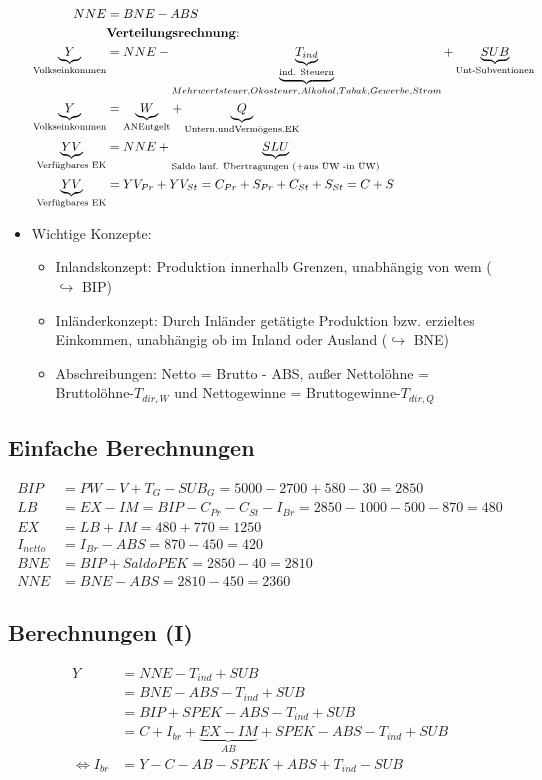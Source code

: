 \documentclass{scrartcl}
\begin{document}
\begin{itemize}
\begin{align*}
      NNE &= BNE - ABS\\
&\text{\textbf{Verteilungsrechnung}:}\\
      \underbrace{Y}_\text{Volkseinkommen} &= NNE - \underbrace{\underbrace{T_{ind}}_\text{ind. Steuern}}_{Mehrwertsteuer, Okosteuer, Alkohol, Tabak, Gewerbe, Strom} + \underbrace{SUB}_\text{Unt-Subventionen}\\
      \underbrace{Y}_\text{Volkseinkommen} & = \underbrace{W}_\text{ANEntgelt} + \underbrace{Q}_\text{Untern.undVerm\"{o}gens.EK}\\
      \underbrace{YV}_\text{Verf\"{u}gbares EK} &= NNE + \underbrace{SLU}_\text{Saldo lauf. \"{U}bertragungen (+aus \"{U}W -in \"{U}W)}\\
      \underbrace{YV}_\text{Verf\"{u}gbares EK}  &= YV_{Pr} + YV_{St} = C_{Pr} + S_{Pr} + C_{St} + S_{St} = C + S
    \end{align*}
\item Wichtige Konzepte:
    \begin{itemize}
        \item Inlandskonzept: Produktion innerhalb Grenzen, unabh\"{a}ngig von wem ($\hookrightarrow$ BIP)
        \item Inl\"{a}nderkonzept: Durch Inl\"{a}nder get\"{a}tigte Produktion bzw. erzieltes Einkommen, unabh\"{a}ngig ob im Inland oder Ausland ($\hookrightarrow$ BNE)
        \item Abschreibungen: Netto = Brutto - ABS, au{\ss}er Nettol\"{o}hne = Bruttol\"{o}hne-$T_{dir,W}$ und Nettogewinne = Bruttogewinne-$T_{dir,Q}$
      \end{itemize}
\end{itemize}
\subsection{Einfache Berechnungen}
\begin{align*}
  BIP &= PW - V + T_G - SUB_G = 5000 - 2700 + 580 - 30 = 2850\\
  LB &= EX - IM = BIP - C_{Pr} - C_{St} - I_{Br} = 2850 - 1000 - 500 - 870 = 480\\
  EX &= LB + IM = 480 + 770 = 1250\\
  I_{netto} &= I_{Br} - ABS = 870-450=420\\
  BNE &= BIP + Saldo PEK = 2850 - 40 = 2810\\
  NNE &= BNE - ABS = 2810 - 450 = 2360
\end{align*}

\subsection{Berechnungen (I)}
\begin{align*}
  Y &= NNE - T_{ind} + SUB \\&= BNE-ABS - T_{ind} + SUB \\&= BIP + SPEK - ABS - T_{ind} + SUB \\&= C+ I_{br}+\underbrace{EX-IM}_{AB} + SPEK - ABS - T_{ind} + SUB\\
  \Leftrightarrow I_{br} &= Y-C-AB-SPEK+ABS+T_{ind}-SUB
\end{align*}
\end{document}
